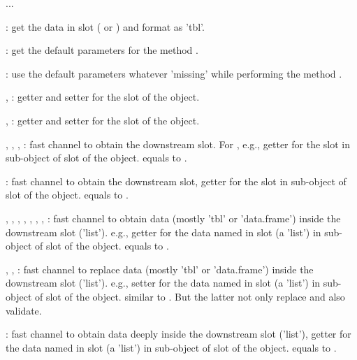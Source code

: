 \documentclass[letterpaper]{book}
\begin{document}
\begin{Description}\relax
...

: get the data in slot
( or )
and format as 'tbl'.

: get the default parameters for the method .

: use the default parameters whatever 'missing'
while performing the method .

, : getter and setter
for the  slot of the object.

, : getter and setter
for the  slot of the object.

, , ,
: fast channel to obtain the downstream slot.
For , e.g., getter for the  slot in sub-object
of  slot of the object. 
equals to .

: fast channel to obtain
the downstream slot, getter
for the  slot in sub-object
of  slot of the object.
equals to .

, , ,
, , ,
, :
fast channel to obtain data (mostly 'tbl' or 'data.frame')
inside the downstream slot ('list'). e.g., getter
for the data named  in
 slot (a 'list') in sub-object
of  slot of the object.
equals to .

, ,
: fast channel to replace
data (mostly 'tbl' or 'data.frame') inside the downstream slot ('list'). e.g., setter
for the data named  in
 slot (a 'list') in sub-object
of  slot of the object.
similar to .
But the latter not only replace and also validate.

: fast channel to obtain
data deeply inside the downstream slot ('list'), getter
for the data named  in
 slot (a 'list') in sub-object
of  slot of the object.
equals to .
\end{Description}
\end{document}

